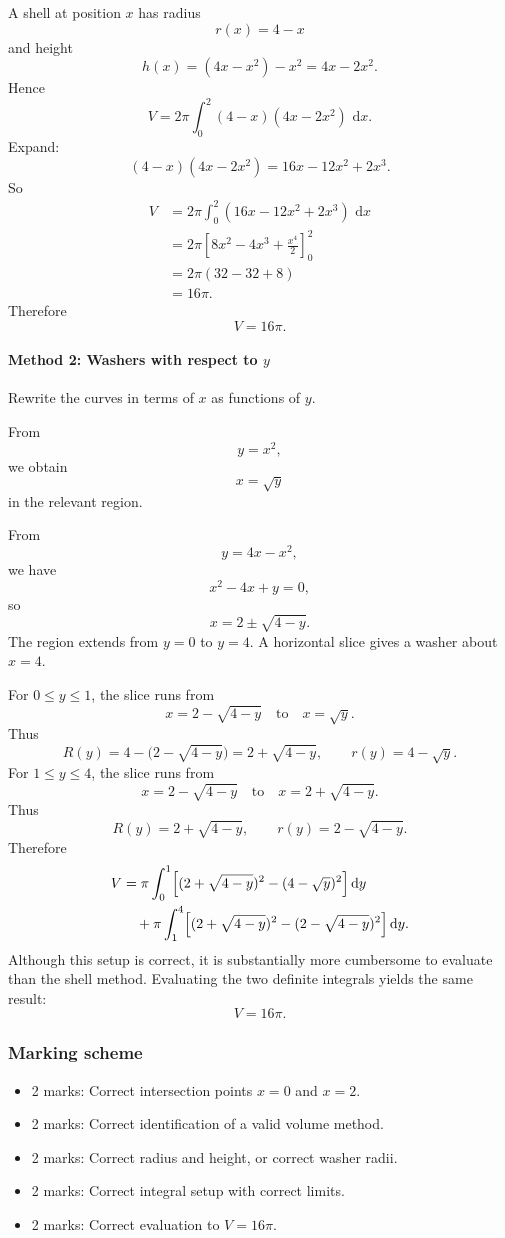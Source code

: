 \documentclass[12pt]{article}
\newcommand{\dd}{\,\mathrm{d}}
\begin{document}
A shell at position \(x\) has radius
\[
r(x)=4-x
\]
and height
\[
h(x)=(4x-x^2)-x^2=4x-2x^2.
\]
Hence
\[
V=2\pi\int_0^2 (4-x)(4x-2x^2)\,\dd x.
\]
Expand:
\[
(4-x)(4x-2x^2)=16x-12x^2+2x^3.
\]
So
\begin{align*}
V
&=2\pi\int_0^2 (16x-12x^2+2x^3)\,\dd x \\
&=2\pi\left[8x^2-4x^3+\frac{x^4}{2}\right]_0^2 \\
&=2\pi(32-32+8) \\
&=16\pi.
\end{align*}
Therefore
\[
\boxed{V=16\pi.}
\]

\paragraph{Method 2: Washers with respect to \(y\)}
Rewrite the curves in terms of \(x\) as functions of \(y\).

From
\[
y=x^2,
\]
we obtain
\[
x=\sqrt{y}
\]
in the relevant region.

From
\[
y=4x-x^2,
\]
we have
\[
x^2-4x+y=0,
\]
so
\[
x=2\pm \sqrt{4-y}.
\]
The region extends from \(y=0\) to \(y=4\). A horizontal slice gives a washer about \(x=4\).

For \(0\le y\le 1\), the slice runs from
\[
x=2-\sqrt{4-y}
\quad\text{to}\quad
x=\sqrt{y}.
\]
Thus
\[
R(y)=4-\bigl(2-\sqrt{4-y}\bigr)=2+\sqrt{4-y},
\qquad
r(y)=4-\sqrt{y}.
\]
For \(1\le y\le 4\), the slice runs from
\[
x=2-\sqrt{4-y}
\quad\text{to}\quad
x=2+\sqrt{4-y}.
\]
Thus
\[
R(y)=2+\sqrt{4-y},
\qquad
r(y)=2-\sqrt{4-y}.
\]
Therefore
\begin{align*}
V
&=\pi\int_0^1\Bigl[(2+\sqrt{4-y})^2-(4-\sqrt{y})^2\Bigr]\dd y \\
&\quad +\pi\int_1^4\Bigl[(2+\sqrt{4-y})^2-(2-\sqrt{4-y})^2\Bigr]\dd y.
\end{align*}
Although this setup is correct, it is substantially more cumbersome to evaluate than the shell method. Evaluating the two definite integrals yields the same result:
\[
\boxed{V=16\pi.}
\]

\subsubsection{Marking scheme}
\begin{itemize}
\item 2 marks: Correct intersection points \(x=0\) and \(x=2\).
\item 2 marks: Correct identification of a valid volume method.
\item 2 marks: Correct radius and height, or correct washer radii.
\item 2 marks: Correct integral setup with correct limits.
\item 2 marks: Correct evaluation to \(V=16\pi\).
\end{itemize}
\end{document}
